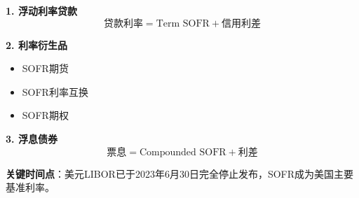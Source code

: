 \textbf{1. 浮动利率贷款}
\begin{equation}
\text{贷款利率} = \text{Term SOFR} + \text{信用利差}
\end{equation}

\textbf{2. 利率衍生品}
\begin{itemize}
    \item SOFR期货
    \item SOFR利率互换
    \item SOFR期权
\end{itemize}

\textbf{3. 浮息债券}
\begin{equation}
\text{票息} = \text{Compounded SOFR} + \text{利差}
\end{equation}

\textbf{关键时间点}：美元LIBOR已于2023年6月30日完全停止发布，SOFR成为美国主要基准利率。

